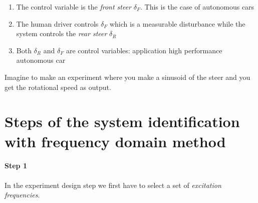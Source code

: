 \begin{exa}
\begin{figure}[H]
    \end{figure}

    \begin{enumerate}
        \item The control variable is the \emph{front steer} $\delta_F$. This is the case of autonomous cars
        \item The human driver controls $\delta_F$ which is a measurable disturbance while the system controls the \emph{rear steer} $\delta_R$ 
        \item Both $\delta_R$ and $\delta_F$ are control variables: application high performance autonomous car
    \end{enumerate}
    
    Imagine to make an experiment where you make a sinusoid of the steer and you get the rotational speed as output.
\end{exa}

\section{Steps of the system identification with frequency domain method }

\paragraph{Step 1} In the experiment design step we first have to select a set of \emph{excitation frequencies}.

